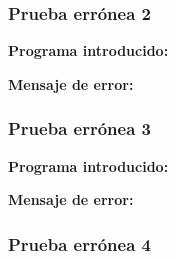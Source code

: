 \documentclass[11pt, , a4paper, titlepage]{article}
\newenvironment{changemargin}[2]{%
\begin{list}{}{%
\setlength{\topsep}{0pt}%
\setlength{\leftmargin}{#1}%
\setlength{\rightmargin}{#2}%
\setlength{\listparindent}{\parindent}%
\setlength{\itemindent}{\parindent}%
\setlength{\parsep}{\parskip}%
}%
\item[]}{\end{list}}
\begin{document}
\subsubsection{Prueba errónea 2}

\begin{changemargin}{+0.5cm}{+0cm}
    \vspace{1mm}

    \textbf{Programa introducido:}
    \begin{changemargin}{+0.5cm}{+0cm}
        
    \end{changemargin}

    \vspace{2mm}

    \textbf{Mensaje de error:}
    \vspace{1mm}
    \begin{changemargin}{+0.5cm}{+0cm}
    \end{changemargin}

\end{changemargin}

\subsubsection{Prueba errónea 3}

\begin{changemargin}{+0.5cm}{+0cm}
    \vspace{1mm}

    \textbf{Programa introducido:}
    \begin{changemargin}{+0.5cm}{+0cm}
        
    \end{changemargin}

    \vspace{2mm}

    \textbf{Mensaje de error:}
    \vspace{1mm}
    \begin{changemargin}{+0.5cm}{+0cm}
    \end{changemargin}

\end{changemargin}

\subsubsection{Prueba errónea 4}
\end{document}
